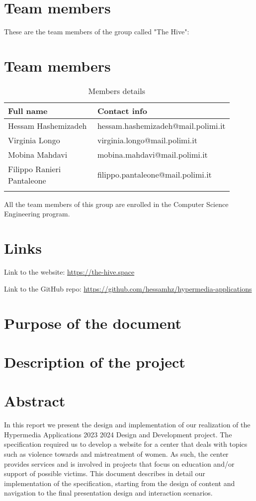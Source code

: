 \section{Team members}
These are the team members of the group called "The Hive":
\section{Team members}
\begin{longtable}
    {|m{0.4\linewidth}|m{0.5\linewidth}|}
            \hline
            \textbf{Full name} & \textbf{Contact info}\\
            \hline
            \endhead
                Hessam Hashemizadeh & hessam.hashemizadeh@mail.polimi.it \\
            \hline
                Virginia Longo & virginia.longo@mail.polimi.it \\
            \hline
                Mobina Mahdavi & mobina.mahdavi@mail.polimi.it \\
            \hline
                Filippo Ranieri Pantaleone & filippo.pantaleone@mail.polimi.it \\
            \hline
            \caption{Members details}
            \label{table:mem_details}
\end{longtable}


All the team members of this group are enrolled in the Computer Science Engineering program.

\section{Links}
Link to the website: \url{https://the-hive.space}

Link to the GitHub repo: \url{https://github.com/hessamhz/hypermedia-applications}

\section{Purpose of the document}

\section{Description of the project}

\section{Abstract}
In this report we present the design and implementation of our realization of the Hypermedia Applications 2023 2024 Design and Development project.
The specification required us to develop a website for a center that deals with topics such as violence towards and mistreatment of women. As such,
the center provides services and is involved in projects that focus on education and/or support of possible victims. This document describes in detail
our implementation of the specification, starting from the design of content and navigation to the final presentation design and interaction scenarios.
